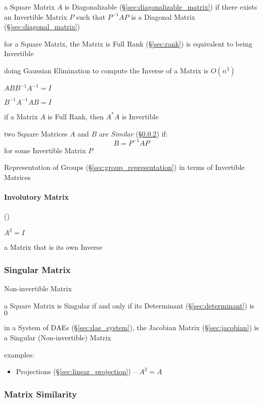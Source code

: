 a Square Matrix $A$ is Diagonalizable (\S\ref{sec:diagonalizable_matrix}) if
there exists an Invertible Matrix $P$ such that $P^{-1}AP$ is a Diagonal Matrix
(\S\ref{sec:diagonal_matrix})

for a Square Matrix, the Matrix is Full Rank (\S\ref{sec:rank}) is
equivalent to being Invertible

doing Gaussian Elimination to compute the Inverse of a Matrix is $O(n^3)$

$ABB^{-1}A^{-1} = I$

$B^{-1}A^{-1}AB = I$

if a Matrix $A$ is Full Rank, then $A^*A$ is Invertible

two Square Matrices $A$ and $B$ are \emph{Similar}
(\S\ref{sec:matrix_similarity}) if:
\[
  B = P^{-1}AP
\]
for some Invertible Matrix $P$

\fist Representation of Groups (\S\ref{sec:group_representation}) in terms of
Invertible Matrices



\paragraph{Involutory Matrix} (\label{sec:involutory_matrix})\hfill

$A^2 = I$

a Matrix that is its own Inverse



\subsubsection{Singular Matrix}\label{sec:singular_matrix}

Non-invertible Matrix

a Square Matrix is Singular if and only if its Determinant
(\S\ref{sec:determinant}) is $0$

\fist in a System of DAEs (\S\ref{sec:dae_system}), the Jacobian Matrix
(\S\ref{sec:jacobian}) is a Singular (Non-invertible) Matrix

examples:
\begin{itemize}
  \item Projections (\S\ref{sec:linear_projection}) -- $A^2 = A$
\end{itemize}



\subsubsection{Matrix Similarity}\label{sec:matrix_similarity}


